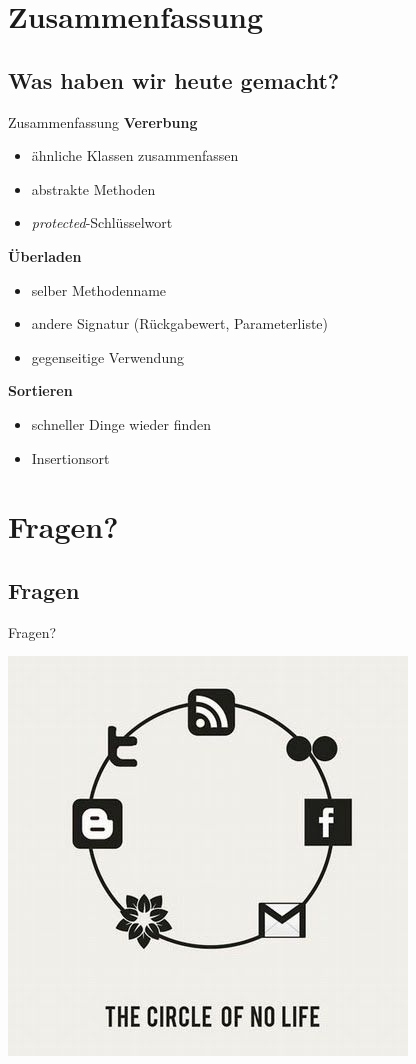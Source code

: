 \documentclass[18pt]{beamer}
\begin{document}
\section{Zusammenfassung}
\subsection*{Was haben wir heute gemacht?}
\begin{frame}{Zusammenfassung}
	\textbf{Vererbung}
	\begin{itemize}
		\item ähnliche Klassen zusammenfassen
		\item abstrakte Methoden
		\item \emph{protected}-Schlüsselwort
	\end{itemize}
	
	\textbf{Überladen}
	\begin{itemize}
		\item selber Methodenname
		\item andere Signatur (Rückgabewert, Parameterliste)
		\item gegenseitige Verwendung
	\end{itemize}
	
	\textbf{Sortieren}
	\begin{itemize}
		\item schneller Dinge wieder finden
		\item Insertionsort
	\end{itemize}
\end{frame}

\section{Fragen?}
\subsection*{Fragen} %
\begin{frame}	
	\begin{center}
		\huge{Fragen?}
	\end{center}
\end{frame}



\begin{frame}[full]
\includegraphics[scale=0.55]{bilder/comics/September-25-2011-18-44-59-aa71ce1bd67502c27bc56a6b8d724897.jpeg}
\end{frame}
\end{document}
